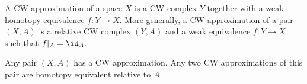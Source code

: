 
\begin{definition}[CW approximation]
A CW approximation of a space $X$ is a CW complex $Y$ together with a weak
homotopy equivalence $f:Y\to X$. More generally, a CW approximation of a pair
$(X,A)$ is a relative CW complex $(Y,A)$ and a weak equivalence $f:Y\to X$
such that $f|_A=\id_A$.
\end{definition}
\begin{theorem}
Any pair $(X,A)$ has a CW approximation. Any two CW approximations of this pair
are homotopy equivalent relative to $A$.
\end{theorem}
